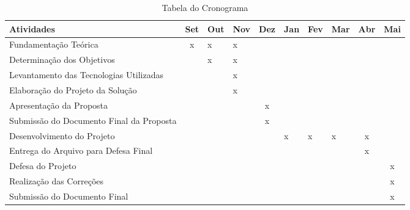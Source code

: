 \begin{table}[!htb]
\centering
\begin{tabular}{|l|l|l|l|l|l|l|l|l|l|}
\hline
Atividades                               & Set                    & Out & Nov & Dez                    & Jan & Fev & Mar & Abr                    & Mai                    \\ \hline
Fundamentação Teórica                    & \multicolumn{1}{c|}{x} & x   & x   &                        &     &     &     &                        &                        \\ \hline
Determinação dos Objetivos               &                        & x   & x   &                        &     &     &     &                        &                        \\ \hline
Levantamento das Tecnologias Utilizadas  &                        &     & x   &                        &     &     &     &                        &                        \\ \hline
Elaboração do Projeto da Solução         &                        &     & x   &                        &     &     &     &                        &                        \\ \hline
Apresentação da Proposta                 &                        &     &     & \multicolumn{1}{c|}{x} &     &     &     &                        &                        \\ \hline
Submissão do Documento Final da Proposta &                        &     &     & \multicolumn{1}{c|}{x} &     &     &     &                        &                        \\ \hline
Desenvolvimento do Projeto               &                        &     &     &                        & x   & x   & x   & \multicolumn{1}{c|}{x} &                        \\ \hline
Entrega do Arquivo para Defesa Final     &                        &     &     &                        &     &     &     & \multicolumn{1}{c|}{x} &                        \\ \hline
Defesa do Projeto                        &                        &     &     &                        &     &     &     &                        & \multicolumn{1}{c|}{x} \\ \hline
Realização das Correções                 &                        &     &     &                        &     &     &     &                        & \multicolumn{1}{c|}{x} \\ \hline
Submissão do Documento Final             &                        &     &     &                        &     &     &     &                        & \multicolumn{1}{c|}{x} \\ \hline
\end{tabular}
\caption{Tabela do Cronograma}
\label{tab:tabela-cronograma}
\end{table}